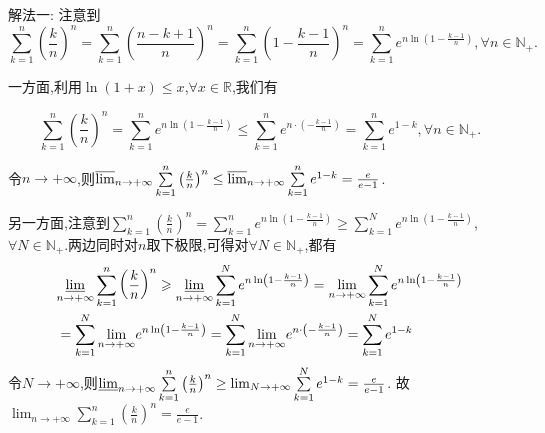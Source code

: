 \documentclass[../../main.tex]{subfiles}
\begin{document}
\begin{solution}
{\color{blue}解法一:}
注意到
\[
\sum\limits_{k = 1}^{n}\left(\frac{k}{n}\right)^n = \sum\limits_{k = 1}^{n}\left(\frac{n - k + 1}{n}\right)^n = \sum\limits_{k = 1}^{n}\left(1 - \frac{k - 1}{n}\right)^n = \sum\limits_{k = 1}^{n}e^{n\ln\left(1 - \frac{k - 1}{n}\right)},  \forall n \in \mathbb{N}_+.
\]

一方面,利用\(\ln(1 + x) \leq x\),\(\forall x \in \mathbb{R}\),我们有

\[
\sum\limits_{k = 1}^{n}\left(\frac{k}{n}\right)^n = \sum\limits_{k = 1}^{n}e^{n\ln\left(1 - \frac{k - 1}{n}\right)} \leq \sum\limits_{k = 1}^{n}e^{n\cdot\left(-\frac{k - 1}{n}\right)} = \sum\limits_{k = 1}^{n}e^{1 - k},  \forall n \in \mathbb{N}_+.
\]

令\(n \to +\infty\),则\(\varlimsup_{n \to +\infty}\sum\limits_{k = 1}^{n}\left(\frac{k}{n}\right)^n \leq \varlimsup_{n \to +\infty}\sum\limits_{k = 1}^{n}e^{1 - k} = \frac{e}{e - 1}\).

另一方面,注意到\(\sum\limits_{k = 1}^{n}\left(\frac{k}{n}\right)^n = \sum\limits_{k = 1}^{n}e^{n\ln\left(1 - \frac{k - 1}{n}\right)} \geq \sum\limits_{k = 1}^{N}e^{n\ln\left(1 - \frac{k - 1}{n}\right)}\),\(\forall N \in \mathbb{N}_+\).两边同时对\(n\)取下极限,可得对\(\forall N \in \mathbb{N}_+\),都有
\begin{align*}
&\underset{n\rightarrow +\infty}{{\varliminf }}\sum\limits_{k=1}^n{\left( \frac{k}{n} \right) ^n}\geqslant \underset{n\rightarrow +\infty}{{\varliminf }}\sum\limits_{k=1}^N{e^{n\ln \left( 1-\frac{k-1}{n} \right)}}=\underset{n\rightarrow +\infty}{\lim}\sum\limits_{k=1}^N{e^{n\ln \left( 1-\frac{k-1}{n} \right)}}
\\
&=\sum\limits_{k=1}^N{\underset{n\rightarrow +\infty}{\lim}e^{n\ln \left( 1-\frac{k-1}{n} \right)}}=\sum\limits_{k=1}^N{\underset{n\rightarrow +\infty}{\lim}e^{n\cdot \left( -\frac{k-1}{n} \right)}}=\sum\limits_{k=1}^N{e^{1-k}}
\end{align*}
令\(N \to +\infty\),则\(\varliminf_{n \to +\infty}\sum\limits_{k = 1}^{n}\left(\frac{k}{n}\right)^n \geq \lim_{N \to +\infty}\sum\limits_{k = 1}^{N}e^{1 - k} = \frac{e}{e - 1}\).
故\(\lim_{n \to +\infty}\sum\limits_{k = 1}^{n}\left(\frac{k}{n}\right)^n = \frac{e}{e - 1}\). 


\end{solution}
\end{document}
